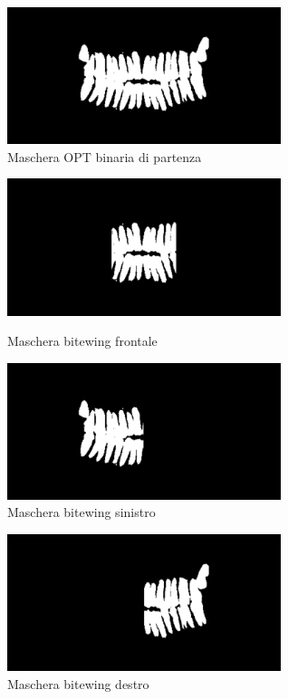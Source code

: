 \documentclass[12pt,a4paper,openright,twoside]{book}
\begin{document}
\begin{figure}[H]
    \centering
    \includegraphics[width=8cm]{figures/maskintera.pdf}
    \caption{Maschera OPT binaria di partenza}
    \label{fig:maskintera}
\end{figure}
\begin{figure}[H]
    \centering
    \begin{minipage}{0.4\textwidth}
	\centering
    	\includegraphics[width=8cm]{figures/maskfrontal.pdf}
    	\caption{Maschera bitewing frontale}
    	\label{lab:Maschera bitewing frontale}
    \end{minipage} \hfill
    \begin{minipage}{0.4\textwidth}
    	\centering
    	\includegraphics[width=8cm]{figures/masksx.pdf}
    	\caption{Maschera bitewing sinistro}
    	\label{lab:Maschera bitewing sinistro}
    \end{minipage}
\end{figure}
\begin{figure}[H]
    \centering
    \includegraphics[width=8cm]{figures/maskdx.pdf}
    \caption{Maschera bitewing destro}
    \label{fig:Maschera bitewing destro}
\end{figure}
\end{document}
